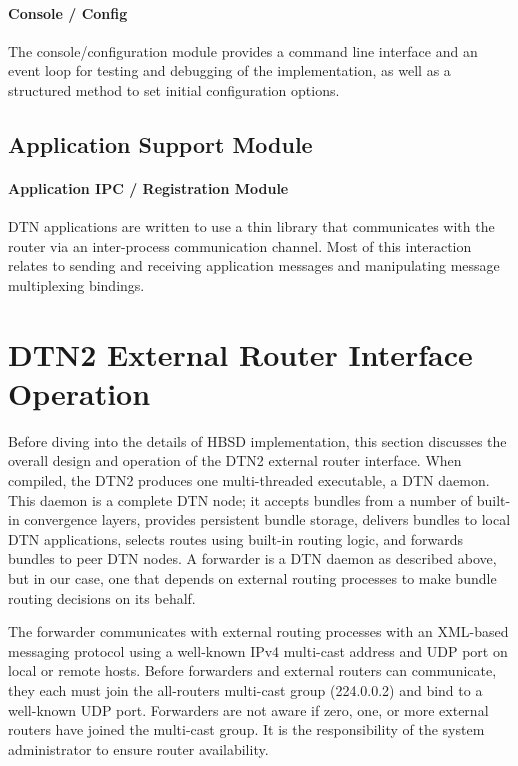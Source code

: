 \paragraph{Console / Config}
The console/configuration module provides a command line interface and an event loop for testing and debugging of the implementation, as well as a structured method
to set initial configuration options. 

\subsection{Application Support Module}

\paragraph{Application IPC / Registration Module}

DTN applications are written to use a thin library that communicates with the router via an inter-process communication channel. Most of this interaction relates to
sending and receiving application messages and manipulating message multiplexing bindings.

\section{DTN2 External Router Interface Operation}

Before diving into the details of HBSD implementation, this section discusses the overall design and operation of the DTN2 external router interface. When compiled, the DTN2 produces one multi-threaded executable, a DTN daemon. This daemon is a complete DTN node; it accepts bundles from a number of built-in convergence layers, provides persistent bundle storage, delivers bundles to local DTN applications, selects routes using built-in routing logic, and forwards bundles to peer DTN nodes. A forwarder is a DTN daemon as described above, but in our case, one that depends on external routing processes to make bundle routing decisions on its behalf.

The forwarder communicates with external routing processes with an XML-based messaging protocol using a well-known IPv4 multi-cast address and UDP port on local or remote hosts. Before forwarders and external routers can communicate, they each must join the all-routers multi-cast group (224.0.0.2) and bind to a well-known UDP port. Forwarders are not aware if zero, one, or more external routers have joined the multi-cast group. It is the responsibility of the system administrator to ensure router availability.

